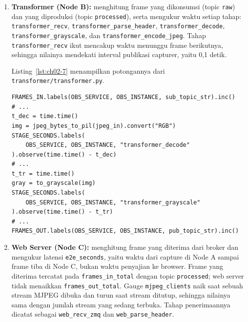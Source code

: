 \begin{enumerate}
\begin{enumerate}
\begin{lstlisting}[style=PythonStyle, breakatwhitespace=true, caption={Potongan kode pada Tahapan Eksperimen (3)}, label={lst:ch02-6}]
    FRAMES_OUT.labels(OBS_SERVICE, OBS_INSTANCE, TOPIC_XPUB).inc()
    BYTES_OUT.labels(OBS_SERVICE, OBS_INSTANCE, TOPIC_XPUB).inc(total_bytes)
\end{lstlisting}

  \item \textbf{Transformer (Node B):} menghitung frame yang dikonsumsi (topic \texttt{raw}) dan yang diproduksi (topic \texttt{processed}), serta mengukur waktu setiap tahap: \texttt{transformer\_recv}, \texttt{transformer\_parse\_header}, \texttt{transformer\_decode}, \texttt{transformer\_grayscale}, dan \texttt{transformer\_encode\_jpeg}. Tahap \texttt{transformer\_recv} ikut mencakup waktu menunggu frame berikutnya, sehingga nilainya mendekati interval publikasi capturer, yaitu 0,1 detik.

Listing~\ref{lst:ch02-7} menampilkan potongannya dari \texttt{transformer/transformer.py}.
\begin{lstlisting}[style=PythonStyle, breakatwhitespace=true, caption={Potongan kode pada Tahapan Eksperimen (4)}, label={lst:ch02-7}]
FRAMES_IN.labels(OBS_SERVICE, OBS_INSTANCE, sub_topic_str).inc()
# ...
t_dec = time.time()
img = jpeg_bytes_to_pil(jpeg_in).convert("RGB")
STAGE_SECONDS.labels(
    OBS_SERVICE, OBS_INSTANCE, "transformer_decode"
).observe(time.time() - t_dec)
# ...
t_tr = time.time()
gray = to_grayscale(img)
STAGE_SECONDS.labels(
    OBS_SERVICE, OBS_INSTANCE, "transformer_grayscale"
).observe(time.time() - t_tr)
# ...
FRAMES_OUT.labels(OBS_SERVICE, OBS_INSTANCE, pub_topic_str).inc()
\end{lstlisting}

  \item \textbf{Web Server (Node C):} menghitung frame yang diterima dari broker dan mengukur latensi \texttt{e2e\_seconds}, yaitu waktu dari capture di Node A sampai frame tiba di Node C, bukan waktu penyajian ke browser. Frame yang diterima tercatat pada \texttt{frames\_in\_total} dengan topic \texttt{processed}; web server tidak menaikkan \texttt{frames\_out\_total}. Gauge \texttt{mjpeg\_clients} naik saat sebuah stream MJPEG dibuka dan turun saat stream ditutup, sehingga nilainya sama dengan jumlah stream yang sedang terbuka. Tahap penerimaannya dicatat sebagai \texttt{web\_recv\_zmq} dan \texttt{web\_parse\_header}.


\end{enumerate}
\end{enumerate}
